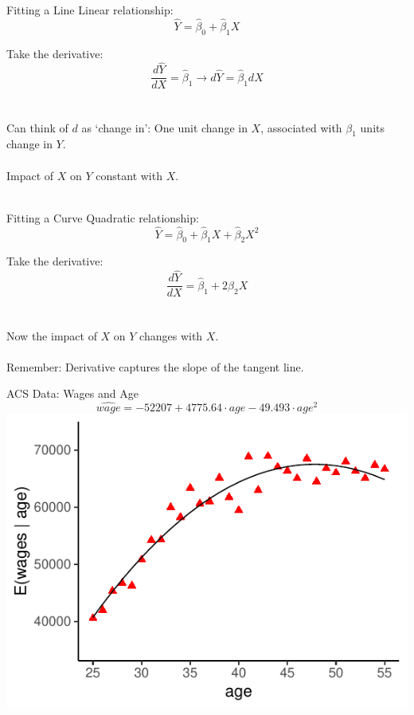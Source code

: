 \documentclass{./../div_teaching_slides}
\begin{document}
\begin{frame}{Fitting a Line}
Linear relationship:
$$ \hat{Y} = \hat{\beta}_0 + \hat{\beta}_1 X   $$

Take the derivative:
$$ \frac{d \hat{Y}}{dX} = \hat{\beta}_1 \rightarrow d \hat{Y} = \hat{\beta}_1 dX  $$ \\~\\

Can think of $d$ as `change in':
One unit change in $X$, associated with $\beta_1$ units change in $Y$. \\~\\
Impact of $X$ on $Y$ constant with $X$. \\~\\
\end{frame}

\begin{frame}{Fitting a Curve}
Quadratic relationship:
$$ \hat{Y} = \hat{\beta}_0 + \hat{\beta}_1 X + \hat{\beta}_2 X^2   $$

Take the derivative:
$$ \frac{d \hat{Y}}{dX} = \hat{\beta}_1 + 2 \hat{\beta}_2 X $$ \\~\\

Now the impact of $X$ on $Y$ changes with $X$. \\~\\
Remember: Derivative captures the slope of the tangent line.

\end{frame}

\begin{frame}{ACS Data: Wages and Age}
\centering \vspace{-2em}
$$ \hat{wage} = -52207 + 4775.64 \cdot age -49.493 \cdot age^2   $$
\includegraphics{./../../output/scatter_age_wage_qfit.pdf}
\end{frame}
\end{document}
